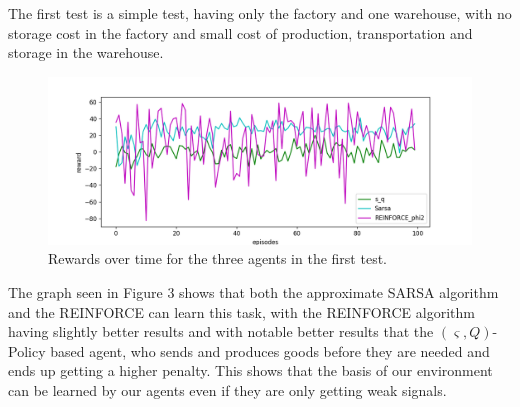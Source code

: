 \documentclass[journal, a4paper]{IEEEtran}
\theoremstyle{plain}
\theoremstyle{definition}
\begin{document}
The first test is a simple test, having only the factory and one warehouse,  with no storage cost in the factory and small cost of production, transportation and storage in the warehouse. 
\begin{figure}[h]
	\centering
	\includegraphics[width=\columnwidth]{medium_2_env_rewards.png}
	\caption{\label{medium_2_env_rewards} Rewards over time for the three agents in the first test.}
\end{figure}
\newline
The graph seen in Figure 3 shows that both the approximate SARSA algorithm and the REINFORCE can learn this task, with the REINFORCE algorithm having slightly better results and with notable better results that the $(\varsigma, Q)$-Policy based agent, who sends and produces goods before they are needed and ends up getting a higher penalty. This shows that the basis of our environment can be learned by our agents even if they are only getting weak signals.\newline
\end{document}
